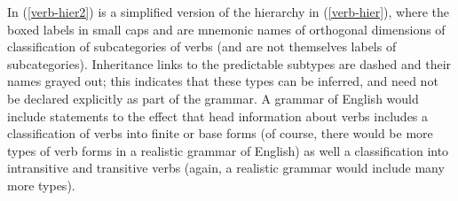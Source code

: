 \documentclass[output=paper]{langsci/langscibook}
\begin{document}
In (\ref{verb-hier2}) is a simplified version of the hierarchy in (\ref{verb-hier}), where the boxed labels in small caps  and  are mnemonic names of orthogonal dimensions of classification  of subcategories of verbs (and are not themselves labels of subcategories). Inheritance links to the predictable subtypes are dashed and their names grayed out; this indicates that these types can be inferred, and need not be declared explicitly as part of the grammar. A grammar of English would include statements to the effect that head information about verbs includes a classification of verbs into finite or base forms (of course, there would be more types of verb forms in a realistic grammar of English) as well a classification into intransitive and transitive verbs (again, a realistic grammar would include many more types).


\begin{exe}
  \ex\label{verb-hier2}
\end{exe}
\end{document}
